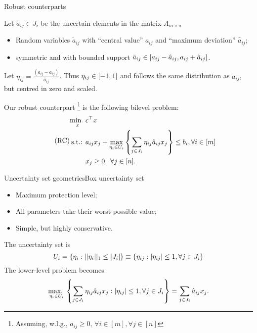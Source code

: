 \begin{frame}{Robust counterparts}

	Let $\tilde{a}_{ij} \in J_i$ be the \alert{uncertain elements} in the matrix $A_{m \times n}$ 
	\vspace{-6pt}
	\begin{itemize}
		\item Random variables $\tilde{a}_{ij}$ with ``central value'' $a_{ij}$ and ``maximum deviation'' $\hat{a}_{ij}$;
		\item symmetric and with bounded support $\tilde{a}_{ij} \in \left[ a_{ij} - \hat{a}_{ij} , a_{ij} + \hat{a}_{ij} \right]$.
	\end{itemize}
	
	\pause
	Let $\eta_{ij} = \frac{(\tilde{a}_{ij} - a_{ij})}{\hat{a}_{ij}}$. Thus $\eta_{ij} \in \left[ -1,1 \right]$ and follows the \alert{same distribution} as $\tilde{a}_{ij}$, but centred in zero and scaled. 
 
	Our robust counterpart%
	\footnote{Assuming, w.l.g., $a_{ij} \ge 0$, $\forall i \in [m], \forall j \in [n]$}
	 is the following \alert{bilevel} problem:
	\begin{equation} \tag{RC}
		\begin{aligned}
			\mathop{\text{min.} \ }_x & c^\top x \\
			\text{s.t.: } & a_{ij}x_j + \max_{\eta_i \in U_i} \left\{ \sum_{j \in J_i}\eta_{ij}\hat{a}_{ij}x_j \right \} \le b_i, \forall i \in [m] \\
			& x_j \ge 0, \ \forall j \in [n].			
		\end{aligned}
	\end{equation}
\end{frame}

\begin{frame}{Uncertainty set geometries}{Box uncertainty set \cite{soyster1973convex}}

	\begin{itemize}
		\item \alert{Maximum} protection level;
		\item All parameters take their worst-possible value;
		\item Simple, but highly conservative.
	\end{itemize}

	The \alert{uncertainty set} is
	$$
		U_i = \left\{ \eta_i : ||\eta_i||_1 \le |J_i| \right \} \equiv \left\{ \eta_{ij} : |\eta_{ij}| \le 1, \forall j \in J_i \right \}
	$$
	\pause
	The \alert{lower-level problem} becomes
	\begin{equation*}
		\mathop{\text{max.} \ }_{\eta_i \in U_i}\left\{ \sum_{j \in J_i} \eta_{ij}\hat{a}_{ij}x_j : |\eta_{ij}| \le 1, \forall j \in J_i \right \} = \sum_{j \in J_i}\hat{a}_{ij}x_j.
	\end{equation*}	

\end{frame}

